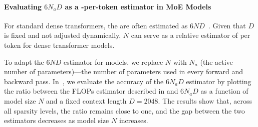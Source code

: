 

\paragraph{Evaluating \(6N_aD\) as a \flops-per-token estimator in MoE Models}
For standard dense transformers, the \flops are often estimated as $6ND$~\citep{kaplan_scale,hoffmann2022training}. Given that $D$ is fixed and not adjusted dynamically, $N$ can serve as a relative estimator of \flops per token for dense transformer models.

To adapt the $6ND$ estimator for \moe models, we replace \(N\) with \(N_a\) (the active number of parameters)---the number of parameters used in every forward and backward pass. 
In~, we evaluate the accuracy of the $6N_aD$ estimator by plotting the ratio between the \moe FLOPs estimator described in  and $6N_aD$ as a function of model size $N$ and a fixed context length \(D = 2048\). The results show that, across all sparsity levels, the ratio remains close to one, and the gap between the two estimators decreases as model size \(N\) increases.

